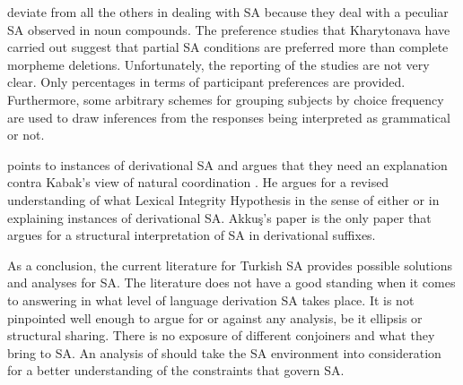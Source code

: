 \cite{kharytonava2011morphology,kharytonava2012word,kharytonava2012taming} deviate from all the others in dealing with SA because they deal with a peculiar SA observed in noun compounds. The preference studies that Kharytonava have carried out suggest that partial SA conditions are preferred more than complete morpheme deletions. Unfortunately, the reporting of the studies are not very clear. Only percentages in terms of participant preferences are provided. Furthermore, some arbitrary schemes for grouping subjects by choice frequency are used to draw inferences from the responses being interpreted as grammatical or not. 

\cite{akkucs2016suspended} points to instances of derivational SA and argues that they need an explanation contra Kabak's view of natural coordination \citep{walchli2005co}. He argues for a revised understanding of what Lexical Integrity Hypothesis in the sense of either \cite{ackema2004beyond} or \cite{lieber2006lexical} in explaining instances of derivational SA. Akkuş's paper is the only paper that argues for a structural interpretation of SA in derivational suffixes. 

As a conclusion, the current literature for Turkish SA provides possible solutions and analyses for SA. The literature does not have a good standing when it comes to answering in what level of language derivation SA takes place. It is not pinpointed well enough to argue for or against any analysis, be it ellipsis or structural sharing. There is no exposure of different conjoiners and what they bring to SA. An analysis of should take the SA environment into consideration for a better understanding of the constraints that govern SA.